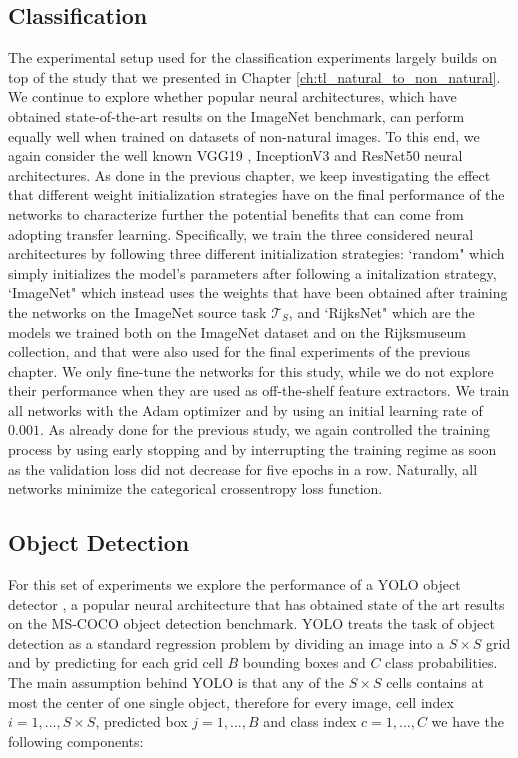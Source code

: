 \subsection{Classification}
The experimental setup used for the classification experiments largely builds on top of the study that we presented in Chapter \ref{ch:tl_natural_to_non_natural}. We continue to explore whether popular neural architectures, which have obtained state-of-the-art results on the ImageNet benchmark, can perform equally well when trained on datasets of non-natural images. To this end, we again consider the well known VGG19 \cite{simonyan2014very}, InceptionV3 \cite{szegedy2016rethinking} and ResNet50 \cite{xie2017aggregated} neural architectures. As done in the previous chapter, we keep investigating the effect that different weight initialization strategies have on the final performance of the networks to characterize further the potential benefits that can come from adopting transfer learning. Specifically, we train the three considered neural architectures by following three different initialization strategies: `random" which simply initializes the model's parameters after following a initalization strategy, `ImageNet" which instead uses the weights that have been obtained after training the networks on the ImageNet source task $\mathcal{T}_S$, and `RijksNet" which are the models we trained both on the ImageNet dataset and on the Rijksmuseum collection, and that were also used for the final experiments of the previous chapter. We only fine-tune the networks for this study, while we do not explore their performance when they are used as off-the-shelf feature extractors. We train all networks with the Adam optimizer \cite{kingma2014adam} and by using an initial learning rate of $0.001$. As already done for the previous study, we again controlled the training process by using early stopping and by interrupting the training regime as soon as the validation loss did not decrease for five epochs in a row. Naturally, all networks minimize the categorical crossentropy loss function.

\subsection{Object Detection}
\label{sec:object_detection_exp}

For this set of experiments we explore the performance of a YOLO object detector \cite{redmon2017yolo9000}, a popular neural architecture that has obtained state of the art results on the MS-COCO object detection benchmark. YOLO treats the task of object detection as a standard regression problem by dividing an image into a $S\times S$ grid and by predicting for each grid cell $B$ bounding boxes and $C$ class probabilities. The main assumption behind YOLO is that any of the $S\times S$ cells contains at most the center of one single object, therefore for every image, cell index $i=1,...,S\times S$, predicted box $j=1,...,B$ and class index $c=1,...,C$ we have the following components: 

